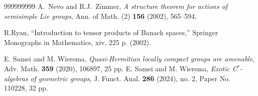 \documentclass[12pt]{amsart}
\theoremstyle{definition}
\theoremstyle{remark}
\numberwithin{equation}{section}
\begin{document}
\begin{thebibliography}{999999999}
 A.~Nevo and R.J.~Zimmer, \emph{A structure theorem for actions of semisimple Lie groups}, Ann. of Math. (2) \textbf{156} (2002), 565--594.

 R.Ryan, ``Introduction to tensor products of Banach spaces,''
Springer Monographs in Mathematics, xiv, 225 p. (2002).

 E. Samei and M. Wiersma, \emph{Quasi-Hermitian locally compact groups are amenable},  Adv. Math. \textbf{359} (2020), 106897, 25 pp.
 E. Samei and M. Wiersma,  {\it Exotic C$^*$-algebras of geometric groups}, J. Funct. Anal. \textbf{286} (2024), no. 2, Paper No. 110228, 32 pp.
\end{thebibliography}
\end{document}
